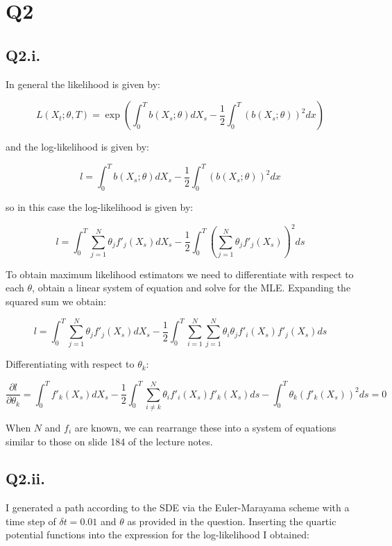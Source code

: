 \documentclass[11pt]{article} %
\begin{document}
\section{Q2}
\subsection{Q2.i.}
In general the likelihood is given by:

\begin{equation}
L(X_{t};\theta, T) = \exp\left(\int^{T}_{0}b(X_{s};\theta)dX_{s} - \frac{1}{2}\int^{T}_{0}(b(X_{s};\theta))^{2}dx\right)
\end{equation}

and the log-likelihood is given by:

\begin{equation}
l = \int^{T}_{0}b(X_{s};\theta)dX_{s} - \frac{1}{2}\int^{T}_{0}(b(X_{s};\theta))^{2}dx
\end{equation}

so in this case the log-likelihood is given by:

\begin{equation}
	l = \int^{T}_{0}\sum^{N}_{j=1}\theta_{j}f'_{j}(X_{s})dX_{s} - \frac{1}{2}\int^{T}_{0}(\sum^{N}_{j=1}\theta_{j}f'_{j}(X_{s}))^{2}ds
\end{equation}

To obtain maximum likelihood estimators we need to differentiate with respect to each $\theta$, obtain a linear system of equation and solve for the MLE. Expanding the squared sum we obtain:

\begin{equation}
	l = \int^{T}_{0}\sum^{N}_{j=1}\theta_{j}f'_{j}(X_{s})dX_{s} -\frac{1}{2}\int^{T}_{0}\sum^{N}_{i=1}\sum^{N}_{j=1}\theta_{i}\theta_{j}f'_{i}(X_{s})f'_{j}(X_{s})ds
\end{equation}

Differentiating with respect to $\theta_{k}$:

\begin{equation}
 \frac{\partial l}{\partial \theta_{k}} = \int^{T}_{0}f'_{k}(X_{s})dX_{s} - \frac{1}{2}\int^{T}_{0}\sum^{N}_{i\neq k}\theta_{i}f'_{i}(X_{s})f'_{k}(X_{s})ds - \int^{T}_{0}\theta_{k}(f'_{k}(X_{s}))^{2}ds = 0
\end{equation}

When $N$ and $f_{i}$ are known, we can rearrange these into a system of equations similar to those on slide 184 of the lecture notes.

\subsection{Q2.ii.}
I generated a path according to the SDE via the Euler-Marayama scheme with a time step of $\delta t = 0.01$ and $\theta$ as provided in the question. Inserting the quartic potential functions into the expression for the log-likelihood I obtained:
\end{document}
